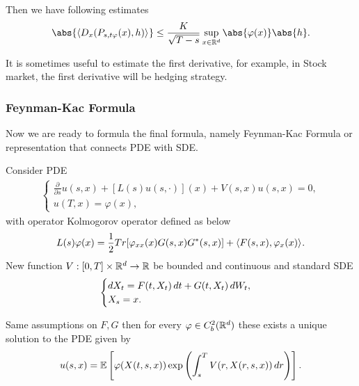 \begin{cor}
Then we have following estimates
\begin{equation*}
    \abs{ \qvar{D_x (P_{s,t\varphi}(x), h)}{}} \leq \frac{K}{\sqrt{T-s}} \sup_{x\in\R^d} \abs{\varphi(x)} \abs{ h}.
\end{equation*}
\end{cor}

\begin{rem}
It is sometimes useful to estimate the first derivative, for example, in Stock market, the first derivative will be hedging strategy.
\end{rem}


\subsubsection{Feynman-Kac Formula}
Now we are ready to formula the final formula, namely Feynman-Kac Formula or representation that connects PDE with SDE.

Consider PDE
\begin{align*}
    \begin{cases}
    \frac{\partial }{\partial s} u(s,x) + [L(s) u(s, \cdot)](x) + V(s,x)u(s,x)= 0,\\
    u(T,x) = \varphi(x),
    \end{cases}
\end{align*}
with operator Kolmogorov operator defined as below
\begin{equation*}
    L(s)\varphi(x) = \frac{1}{2} Tr[\varphi_{xx}(x) G(s,x) G^*(s,x)] + \langle{F(s,x), \varphi_x(x)} \rangle_{}.
\end{equation*}
New function $V: [0,T] \times \mathbb{R}^d \rightarrow \mathbb{R}$ be bounded and continuous and standard SDE
\begin{align*}
    \begin{cases}
   \mathop{}\!d X_t = F(t,X_t)\mathop{}\!d t + G(t,X_t) \mathop{}\!d W_t,\\
    X_s = x.
    \end{cases}
\end{align*}

\begin{thm}
Same assumptions on $F,G$ then for every $\varphi\in C_b^2(\mathbb{R}^d)$ these exists a unique solution to the PDE given by
\begin{equation*}
    u(s,x) = \mathbb{E}\left[\varphi(X(t,s,x))\exp\left(\int_s^T V(r,X(r,s,x)) \mathop{}\!d r \right) \right].
\end{equation*}
\end{thm}

